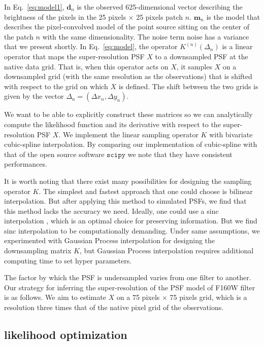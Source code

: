 In Eq.~\ref{eq:model1}, $\mathbf{d}_{n}$ is the observed 625-dimensional vector describing the brightness of the pixels in the 25 pixels $\times$ 25 pixels patch $n$. 
$\mathbf{m}_{n}$ is the model that describes the pixel-convolved model of the point source sitting on the center of the patch $n$ with the same dimensionality. The 
noise term $\mathrm{noise}$ has a variance that we present shortly.
In Eq.~\ref{eq:model}, the operator $K^{(n)}(\Delta_n)$ is a linear operator that maps the super-resolution PSF $X$ to a downsampled PSF at the native 
data grid. That is, when this operator acts on $X$, it samples $X$ on a downsampled grid (with the same resolution as the observations) 
that is shifted with respect to the grid on which $X$ is defined. The shift between the two grids is given by the vector $\Delta_n = (\Delta x_n , \Delta y_n)$.


We want to be able to explicitly construct these matrices so we can analytically compute the likelihood function and its derivative with respect to the super-resolution PSF $X$. 
We implement the linear sampling operator $K$ with bivariate cubic-spline interpolation. By comparing our implementation of cubic-spline with that of the open source 
software $\mathtt{scipy}$ we note that they have consistent performances.

It is worth noting that there exist many possibilities for designing the sampling operator $K$.  The simplest and fastest approach that one could 
choose is bilinear interpolation. But after applying this method to simulated PSFs, we find that this method lacks the accuracy we 
need. Ideally, one could use a sinc interpolation \citep{bickerton,galsim}, which is an optimal choice for preserving information.
But we find sinc interpolation to be computationally demanding. Under same assumptions, we experimented with Gaussian Process interpolation for designing the downsampling matrix $K$, but Gaussian Process interpolation requires additional computing time to set hyper parameters.


The factor by which the PSF is undersampled varies from one filter to another. Our strategy for inferring the super-resolution of the PSF model of F160W filter is as follows. 
We aim to estimate $X$ on a 75 pixels $\times$ 75 pixels grid, which is a resolution three times that of the native pixel grid of the observations.

\subsection{likelihood optimization}

